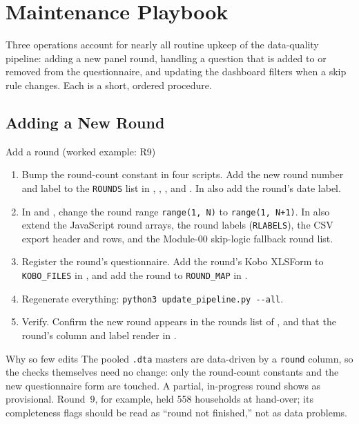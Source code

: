 \section{Maintenance Playbook}

Three operations account for nearly all routine upkeep of the data-quality pipeline: adding a new panel round, handling a question that is added to or removed from the questionnaire, and updating the dashboard filters when a skip rule changes. Each is a short, ordered procedure.

\subsection{Adding a New Round}

\begin{procbox}{Add a round (worked example: R9)}
\begin{enumerate}
  \item Bump the round-count constant in four scripts. Add the new round number and label to the \texttt{ROUNDS} list in , , , and . In  also add the round's date label.
  \item In  and , change the round range \texttt{range(1, N)} to \texttt{range(1, N+1)}. In  also extend the JavaScript round arrays, the round labels (\texttt{RLABELS}), the CSV export header and rows, and the Module-00 skip-logic fallback round list.
  \item Register the round's questionnaire. Add the round's Kobo XLSForm to \texttt{KOBO\_FILES} in , and add the round to \texttt{ROUND\_MAP} in .
  \item Regenerate everything: \texttt{python3 update\_pipeline.py -{}-all}.
  \item Verify. Confirm the new round appears in the rounds list of , and that the round's column and label render in .
\end{enumerate}
\end{procbox}

\begin{notebox}{Why so few edits}
The pooled \texttt{.dta} masters are data-driven by a \texttt{round} column, so the checks themselves need no change: only the round-count constants and the new questionnaire form are touched. A partial, in-progress round shows as provisional. Round~9, for example, held 558 households at hand-over; its completeness flags should be read as ``round not finished,'' not as data problems.
\end{notebox}

